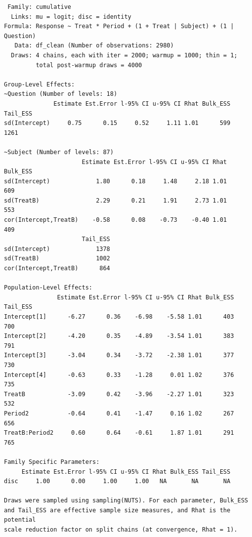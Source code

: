\documentclass[
  12pt,
  a4paper,
  extrafontsizes,
  onecolumn,
  openright]{memoir}
\begin{document}
\begin{verbatim}
 Family: cumulative 
  Links: mu = logit; disc = identity 
Formula: Response ~ Treat * Period + (1 + Treat | Subject) + (1 | Question) 
   Data: df_clean (Number of observations: 2980) 
  Draws: 4 chains, each with iter = 2000; warmup = 1000; thin = 1;
         total post-warmup draws = 4000

Group-Level Effects: 
~Question (Number of levels: 18) 
              Estimate Est.Error l-95% CI u-95% CI Rhat Bulk_ESS Tail_ESS
sd(Intercept)     0.75      0.15     0.52     1.11 1.01      599     1261

~Subject (Number of levels: 87) 
                      Estimate Est.Error l-95% CI u-95% CI Rhat Bulk_ESS
sd(Intercept)             1.80      0.18     1.48     2.18 1.01      609
sd(TreatB)                2.29      0.21     1.91     2.73 1.01      553
cor(Intercept,TreatB)    -0.58      0.08    -0.73    -0.40 1.01      409
                      Tail_ESS
sd(Intercept)             1378
sd(TreatB)                1002
cor(Intercept,TreatB)      864

Population-Level Effects: 
               Estimate Est.Error l-95% CI u-95% CI Rhat Bulk_ESS Tail_ESS
Intercept[1]      -6.27      0.36    -6.98    -5.58 1.01      403      700
Intercept[2]      -4.20      0.35    -4.89    -3.54 1.01      383      791
Intercept[3]      -3.04      0.34    -3.72    -2.38 1.01      377      730
Intercept[4]      -0.63      0.33    -1.28     0.01 1.02      376      735
TreatB            -3.09      0.42    -3.96    -2.27 1.01      323      532
Period2           -0.64      0.41    -1.47     0.16 1.02      267      656
TreatB:Period2     0.60      0.64    -0.61     1.87 1.01      291      765

Family Specific Parameters: 
     Estimate Est.Error l-95% CI u-95% CI Rhat Bulk_ESS Tail_ESS
disc     1.00      0.00     1.00     1.00   NA       NA       NA

Draws were sampled using sampling(NUTS). For each parameter, Bulk_ESS
and Tail_ESS are effective sample size measures, and Rhat is the potential
scale reduction factor on split chains (at convergence, Rhat = 1).
\end{verbatim}
\end{document}
